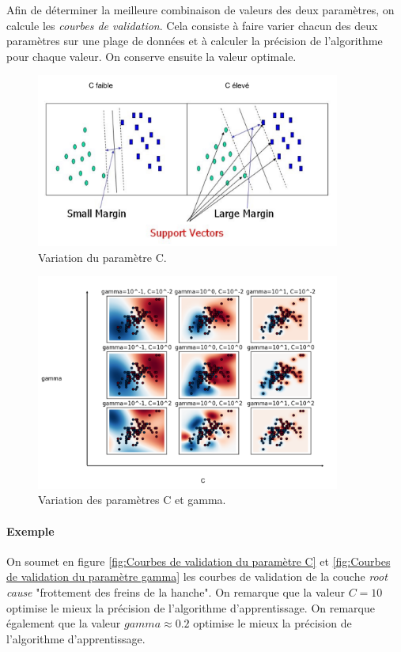 Afin de déterminer la meilleure combinaison de valeurs des deux paramètres, on calcule les \emph{courbes de validation}. Cela consiste à faire varier chacun des deux paramètres sur une plage de données et à calculer la précision de l'algorithme pour chaque valeur. On conserve ensuite la valeur optimale. 

 \begin{figure}[h]
 	\centering\includegraphics[width=10cm]{images/variation_c.png}
 	\caption[Variation du paramètre C]{Variation du paramètre C.}
 	\label{fig:Variation du paramètre C}
 \end{figure}
 
 \begin{figure}[h]
 	\centering\includegraphics[width=10cm]{images/variation_c_gamma.png}
 	\caption[Variation des paramètres C et gamma]{Variation des paramètres C et gamma.}
 	\label{fig:Variation des paramètres C et gamma}
 \end{figure}

 \paragraph{Exemple}
 On soumet en figure \ref{fig:Courbes de validation du paramètre C} et \ref{fig:Courbes de validation du paramètre gamma} les courbes de validation de la couche \emph{root cause} "frottement des freins de la hanche". On remarque que la valeur $C = 10$ optimise le mieux la précision de l'algorithme d'apprentissage. On remarque également que la valeur $gamma \approx 0.2$ optimise le mieux la précision de l'algorithme d'apprentissage.

